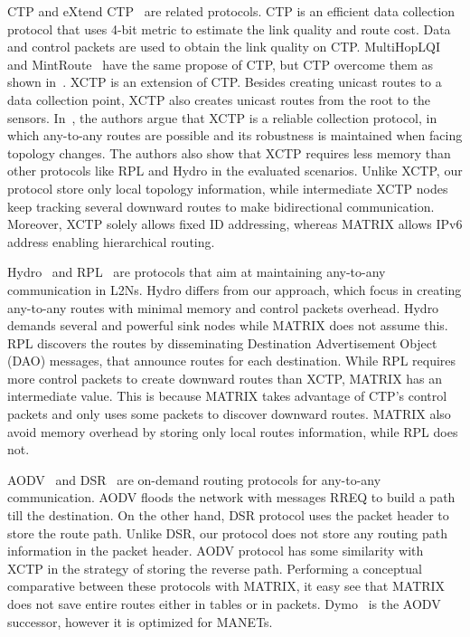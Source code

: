 CTP and eXtend CTP~\cite{xctp} are related protocols. CTP is an efficient data collection protocol that uses 4-bit \cite{fonseca2007four} metric to estimate the link quality and route cost. Data and control packets are used to obtain the link quality on CTP. MultiHopLQI~\cite{MultiHopLQI} and MintRoute~\cite{mintroute} have the same propose of CTP, but CTP overcome them as shown in~\cite{Fonseca:2009}. XCTP is an extension of CTP. Besides creating unicast routes to a data collection point, XCTP also creates unicast routes from the root to the sensors. In~\cite{xctp}, the authors argue that XCTP is a reliable collection protocol, in which any-to-any routes are possible and its robustness is maintained when facing topology changes. The authors also show that XCTP requires less memory than other protocols like RPL and Hydro in the evaluated scenarios. Unlike XCTP, our protocol store only local topology information, while intermediate XCTP nodes keep tracking several downward routes to make bidirectional communication. Moreover, XCTP solely allows fixed ID addressing, whereas MATRIX allows IPv6 address enabling hierarchical routing.

Hydro~\cite{hydro} and RPL~\cite{rfc6550} are protocols that aim at maintaining any-to-any communication in L2Ns. Hydro differs from our approach, which focus in creating any-to-any routes with minimal memory and control packets overhead. Hydro demands several and powerful sink nodes while MATRIX does not assume this. RPL discovers the routes by disseminating Destination Advertisement Object (DAO) messages, that announce routes for each destination. While RPL requires more control packets to create downward routes than XCTP, MATRIX has an intermediate value. This is because MATRIX takes advantage of CTP's control packets and only uses some packets to discover downward routes. MATRIX also avoid memory overhead by storing only local routes information, while RPL does not. 

AODV~\cite{AODV} and DSR~\cite{DSR} are on-demand routing protocols for any-to-any communication. AODV floods the network with messages RREQ to build a path till the destination. On the other hand, DSR protocol uses the packet header to store the route path. Unlike DSR, our protocol does not store any routing path information in the packet header. AODV protocol has some similarity with XCTP in the strategy of storing the reverse path. Performing a conceptual comparative between these protocols with MATRIX, it easy see that MATRIX does not save entire routes either in tables or in packets. Dymo~\cite{dymo} is the AODV successor, however it is optimized for MANETs.

